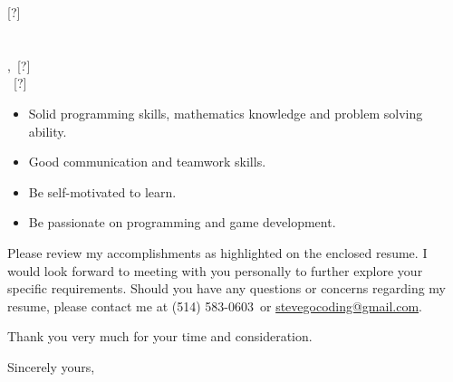 \documentclass{letter}
\makeatletter
\newcommand{\placeholder}               {[?]}
\newcommand{\phcontactname}             {\placeholder}
\newcommand{\phcompanyname}             {\placeholder}
\newcommand{\phcompanyaddr}             {\placeholder}
\newcommand{\phcompanycity}             {\placeholder}
\newcommand{\phcompanyprov}             {\placeholder}
\newcommand{\phcompanynation}           {\placeholder}
\newcommand{\phcompanyzip}              {\placeholder}
\newcommand{\clcontactname}         {\phcontactname}
\newcommand{\clcompanyname}         {\phcompanyname}
\newcommand{\clcompanyaddr}         {\phcompanyaddr}
\newcommand{\clcompanycity}         {\phcompanycity}
\newcommand{\clcompanyprov}         {\phcompanyprov}
\newcommand{\clcompanynation}       {\phcompanynation}
\newcommand{\clcompanyzip}          {\phcompanyzip}
\newcommand{\clmyemail}             {\href{mailto:stevegocoding@gmail.com}{stevegocoding@gmail.com}}
\newcommand{\clmyphone}             {(514) 583-0603}
\makeatother
\begin{document}
\begin{letter}{\clcontactname \\ \clcompanyname \\ \clcompanyaddr \\ \clcompanycity,\ \clcompanyprov \\ \clcompanynation\ \clcompanyzip}
\begin{itemize}
        \item Solid programming skills, mathematics knowledge and problem solving ability.
        \item Good communication and teamwork skills.
        \item Be self-motivated to learn.
        \item Be passionate on programming and game development.
\end{itemize}

Please review my accomplishments as highlighted on the enclosed resume. I would look forward to meeting with you personally to further explore your specific requirements. Should you have any questions or concerns regarding my resume, please contact me at \clmyphone\ or \clmyemail.

Thank you very much for your time and consideration. 

\closing{Sincerely yours,}
\end{letter}
\end{document}
